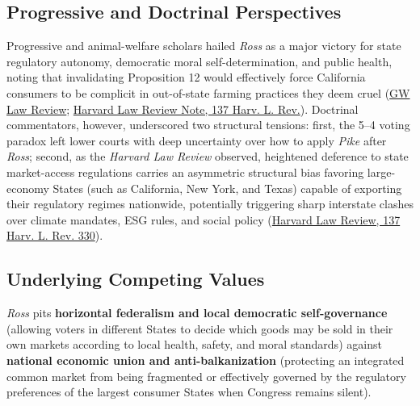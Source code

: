 \documentclass[12pt]{article}
\begin{document}
\subsection{Progressive and Doctrinal Perspectives}
Progressive and animal-welfare scholars hailed \textit{Ross} as a major victory for state regulatory autonomy, democratic moral self-determination, and public health, noting that invalidating Proposition 12 would effectively force California consumers to be complicit in out-of-state farming practices they deem cruel (\href{https://www.gwlr.org/national-pork-producers-council-v-ross-a-win-for-farmed-pigs/}{GW Law Review}; \href{https://harvardlawreview.org/print/vol-137/the-dormant-commerce-clause-and-moral-complicity-in-a-national-marketplace/}{Harvard Law Review Note, 137 Harv. L. Rev.}). Doctrinal commentators, however, underscored two structural tensions: first, the 5--4 voting paradox left lower courts with deep uncertainty over how to apply \textit{Pike} after \textit{Ross}; second, as the \textit{Harvard Law Review} observed, heightened deference to state market-access regulations carries an asymmetric structural bias favoring large-economy States (such as California, New York, and Texas) capable of exporting their regulatory regimes nationwide, potentially triggering sharp interstate clashes over climate mandates, ESG rules, and social policy (\href{https://harvardlawreview.org/print/vol-137/national-pork-producers-council-v-ross/}{Harvard Law Review, 137 Harv. L. Rev. 330}).

\subsection{Underlying Competing Values}
\textit{Ross} pits \textbf{horizontal federalism and local democratic self-governance} (allowing voters in different States to decide which goods may be sold in their own markets according to local health, safety, and moral standards) against \textbf{national economic union and anti-balkanization} (protecting an integrated common market from being fragmented or effectively governed by the regulatory preferences of the largest consumer States when Congress remains silent).
\end{document}
